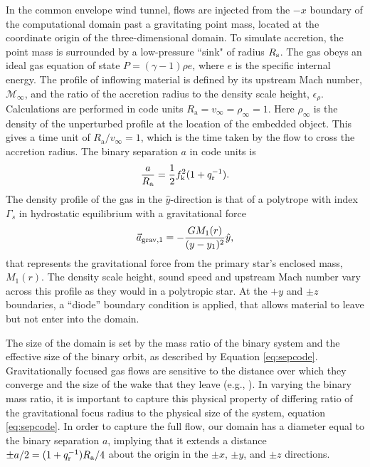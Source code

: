 In the common envelope wind tunnel, flows are injected from the $-x$ boundary of the computational domain past a gravitating point mass, located at the coordinate origin of the three-dimensional domain.  To simulate accretion, the point mass is surrounded by a low-pressure ``sink" of radius $R_{\rm s}$. The gas obeys an ideal gas equation of state $P=(\gamma-1)\rho e$, where $e$ is the specific internal energy. The profile of inflowing material is defined by its upstream Mach number, $\mathcal M_\infty$, and the ratio of the accretion radius to the density scale height, $\epsilon_\rho$.  Calculations are performed in code units $R_{\mathrm{a}} = v_\infty = \rho_\infty = 1$. Here $\rho_\infty$ is the density of the unperturbed profile at the location of the embedded object. This gives a time unit of $R_{\mathrm{a}}/v_\infty = 1$, which is the time taken by the flow to cross the accretion radius. The binary separation $a$ in code units is
\begin{equation}\label{eq:sepcode}
\frac{a}{R_{\rm a}} = \frac{1}{2}f_{\rm k}^2 (1 + q_{\rm r}^{-1}) .
\end{equation}
The density profile of the gas in the $\hat y$-direction is that of a polytrope with index $\Gamma_s$ in hydrostatic equilibrium with a gravitational force 
\begin{equation}
\vec{a}_{\rm grav, 1} = -\frac{GM_1(r)}{(y - y_1)^2}\hat{y},
\end{equation}
that represents the gravitational force from the primary star's enclosed mass, $M_1 (r)$. The density scale height, sound speed and upstream Mach number vary across this profile as they would in a polytropic star.  At the $+y$ and $\pm z$ boundaries, a ``diode'' boundary condition is applied, that allows material to leave but not enter into the domain. 


The size of the domain is set by the mass ratio of the binary system and the effective size of the binary orbit, as described by Equation \eqref{eq:sepcode}. Gravitationally focused gas flows are sensitive to the distance over which they converge and the size of the wake that they leave (e.g., \cite{1999ApJ...513..252O}). In varying the binary mass ratio, it is important to capture this physical property of differing ratio of the gravitational focus radius to the physical size of the system, equation \eqref{eq:sepcode}. In order to capture the full flow, our domain has a diameter equal to the binary separation $a$, implying that it extends a distance $\pm a/2 =  (1 + q_{\rm r}^{-1}) R_{\mathrm{a}}/4$ about the origin in the $\pm x$, $\pm y$, and $\pm z$ directions. 
  
